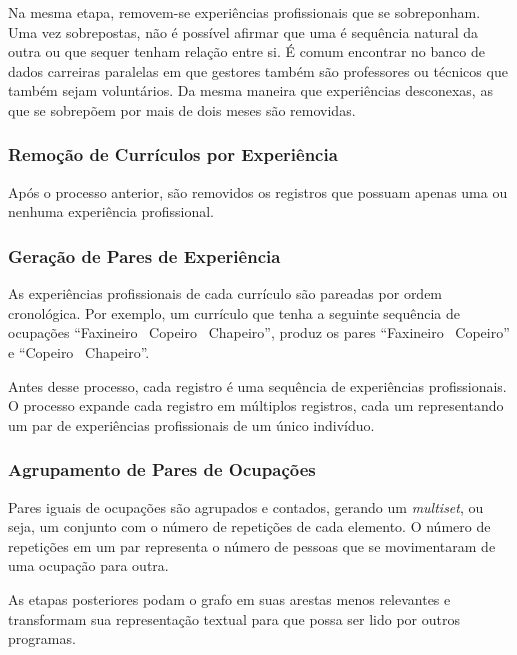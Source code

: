 \documentclass[12pt,a4paper]{article}
\theoremstyle{hypo}
\begin{document}

Na mesma etapa, removem-se experiências profissionais que se sobreponham. Uma vez sobrepostas, não é possível afirmar que uma é sequência natural da outra ou que sequer tenham relação entre si. É comum encontrar no banco de dados carreiras paralelas em que gestores também são professores ou técnicos que também sejam voluntários. Da mesma maneira que experiências desconexas, as que se sobrepõem por mais de dois meses são removidas.

\subsubsection{Remoção de Currículos por Experiência}

Após o processo anterior, são removidos os registros que possuam apenas uma ou nenhuma experiência profissional.

\subsubsection{Geração de Pares de Experiência}

As experiências profissionais de cada currículo são pareadas por ordem cronológica. Por exemplo, um currículo que tenha a seguinte sequência de ocupações \enquote{Faxineiro \textrightarrow~Copeiro \textrightarrow~Chapeiro}, produz os pares \enquote{Faxineiro \textrightarrow~Copeiro} e \enquote{Copeiro \textrightarrow~Chapeiro}.

Antes desse processo, cada registro é uma sequência de experiências profissionais. O processo expande cada registro em múltiplos registros, cada um representando um par de experiências profissionais de um único indivíduo.

\subsubsection{Agrupamento de Pares de Ocupações}

Pares iguais de ocupações são agrupados e contados, gerando um \textit{multiset}, ou seja, um conjunto com o número de repetições de cada elemento. O número de repetições em um par representa o número de pessoas que se movimentaram de uma ocupação para outra.

As etapas posteriores podam o grafo em suas arestas menos relevantes e transformam sua representação textual para que possa ser lido por outros programas.
\end{document}
